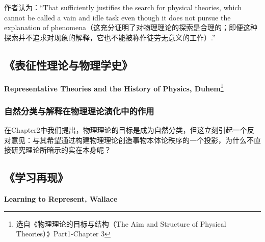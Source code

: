 \documentclass[12pt, a4paper, oneside]{ctexart}
\newcommand{\f}{\footnote}
\begin{document}
作者认为：“That sufficiently justifies the search for physical theories, which cannot be called a vain and idle task even though it does not pursue the explanation of phenomena（这充分证明了对物理理论的探索是合理的；即便这种探索并不追求对现象的解释，它也不能被称作徒劳无意义的工作）.”

\subsection{《表征性理论与物理学史》}
\textbf{Representative Theories and the History of Physics, Duhem}\f{选自《物理理论的目标与结构（The Aim and Structure of Physical Theories）》Part1-Chapter 3}
\subsubsection{自然分类与解释在物理理论演化中的作用}
在Chapter2中我们提出，物理理论的目标是成为自然分类，但这立刻引起一个反对意见：与其希望通过构建物理理论创造事物本体论秩序的一个投影，为什么不直接研究理论所暗示的实在本身呢？



\subsection{《学习再现》}
\textbf{Learning to Represent, Wallace}
\end{document}
